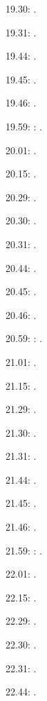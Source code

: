 \label{key}\documentclass[italian]{article}
\begin{document}
19.30:     .

19.31:     .

19.44:     .

19.45:     .

19.46:     .

19.59:     
:    .

20.01:     . 

20.15:     . 

20.29:     . 

20.30:     .

20.31:     .

20.44:     .

20.45:     .

20.46:     .

20.59:     
:    .

21.01:     . 

21.15:     . 

21.29:     . 

21.30:     .

21.31:     .

21.44:     .

21.45:     .

21.46:     .

21.59:     
:    .

22.01:     . 

22.15:     . 

22.29:     . 

22.30:     .

22.31:     .

22.44:     .
\end{document}
